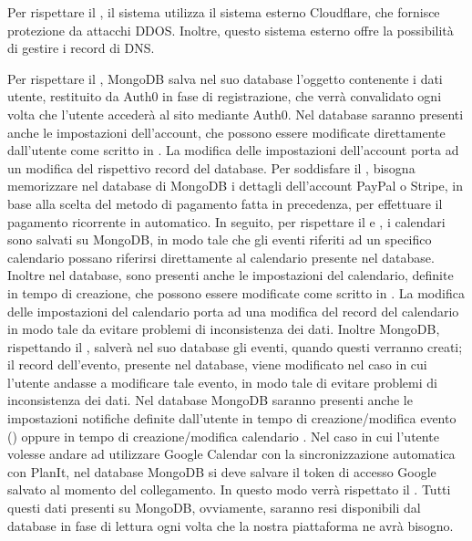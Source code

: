 \begin{listaPersonale}[DC]{}
    Per rispettare il , il sistema utilizza il sistema esterno Cloudflare, che fornisce protezione da attacchi DDOS. Inoltre, questo sistema esterno offre la possibilità di gestire i record di DNS.

    Per rispettare il , MongoDB salva nel suo database l’oggetto contenente i dati utente, restituito da Auth0 in fase di registrazione, che verrà convalidato ogni volta che l’utente accederà al sito mediante Auth0. Nel database saranno presenti anche le impostazioni dell’account, che possono essere modificate direttamente dall’utente come scritto in .  La modifica delle impostazioni dell’account porta ad un modifica del rispettivo record del database. Per soddisfare il , bisogna memorizzare nel database di MongoDB i dettagli dell’account PayPal o Stripe, in base alla scelta del metodo di pagamento fatta in precedenza, per effettuare il pagamento ricorrente in automatico. In seguito, per rispettare il  e , i calendari sono salvati su MongoDB, in modo tale che gli eventi riferiti ad un specifico calendario possano riferirsi direttamente al calendario presente nel database. Inoltre nel database, sono presenti anche le impostazioni del calendario, definite in tempo di creazione, che possono essere modificate come scritto in . La modifica delle impostazioni del calendario porta ad una modifica del record del calendario in modo tale da evitare problemi di inconsistenza dei dati. Inoltre MongoDB, rispettando il , salverà nel suo database gli eventi, quando questi verranno creati; il record dell’evento, presente nel database, viene modificato nel caso in cui l’utente andasse a modificare tale evento, in modo tale di evitare problemi di inconsistenza dei dati. Nel database MongoDB saranno presenti anche le impostazioni notifiche definite dall’utente in tempo di creazione/modifica evento () oppure in tempo di creazione/modifica calendario . Nel caso in cui l’utente volesse andare ad utilizzare Google Calendar con la sincronizzazione automatica con PlanIt, nel database MongoDB si deve salvare il token di accesso Google salvato al momento del collegamento. In questo modo verrà rispettato il . Tutti questi dati presenti su MongoDB, ovviamente, saranno resi disponibili dal database in fase di lettura ogni volta che la nostra piattaforma ne avrà bisogno.



\end{listaPersonale}
